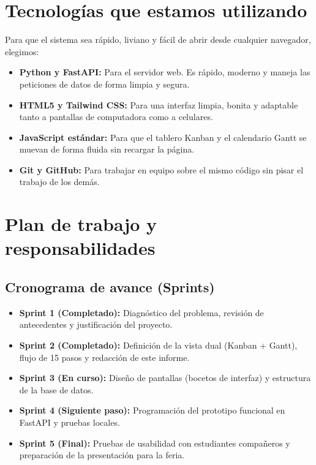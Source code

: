 \documentclass[11pt,a4paper]{article}
\begin{document}
\section{Tecnologías que estamos utilizando}
Para que el sistema sea rápido, liviano y fácil de abrir desde cualquier navegador, elegimos:
\begin{itemize}
    \item \textbf{Python y FastAPI:} Para el servidor web. Es rápido, moderno y maneja las peticiones de datos de forma limpia y segura.
    \item \textbf{HTML5 y Tailwind CSS:} Para una interfaz limpia, bonita y adaptable tanto a pantallas de computadora como a celulares.
    \item \textbf{JavaScript estándar:} Para que el tablero Kanban y el calendario Gantt se muevan de forma fluida sin recargar la página.
    \item \textbf{Git y GitHub:} Para trabajar en equipo sobre el mismo código sin pisar el trabajo de los demás.
\end{itemize}

\section{Plan de trabajo y responsabilidades}

\subsection{Cronograma de avance (Sprints)}
\begin{itemize}
    \item \textbf{Sprint 1 (Completado):} Diagnóstico del problema, revisión de antecedentes y justificación del proyecto.
    \item \textbf{Sprint 2 (Completado):} Definición de la vista dual (Kanban + Gantt), flujo de 15 pasos y redacción de este informe.
    \item \textbf{Sprint 3 (En curso):} Diseño de pantallas (bocetos de interfaz) y estructura de la base de datos.
    \item \textbf{Sprint 4 (Siguiente paso):} Programación del prototipo funcional en FastAPI y pruebas locales.
    \item \textbf{Sprint 5 (Final):} Pruebas de usabilidad con estudiantes compañeros y preparación de la presentación para la feria.
\end{itemize}
\end{document}
